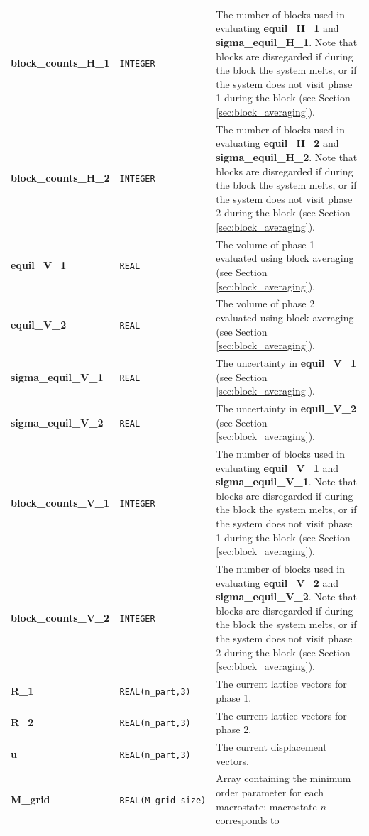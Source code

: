 \documentclass{report}
\begin{document}
\begin{landscape}
\begin{center}
\begin{longtable}{ l l p{8cm}}
\textbf{block\_counts\_H\_1} & \texttt{INTEGER} & The number of blocks used in evaluating \textbf{equil\_H\_1} and \textbf{sigma\_equil\_H\_1}. Note that blocks are
disregarded if during the block the system melts, or if the system does not visit phase 1 during the block  (see Section \ref{sec:block_averaging}). \\
\textbf{block\_counts\_H\_2} & \texttt{INTEGER} &  The number of blocks used in evaluating \textbf{equil\_H\_2} and \textbf{sigma\_equil\_H\_2}. Note that blocks are
disregarded if during the block the system melts, or if the system does not visit phase 2 during the block  (see Section \ref{sec:block_averaging}). \\
\textbf{equil\_V\_1} & \texttt{REAL} & The volume of phase 1 evaluated using block averaging (see Section \ref{sec:block_averaging}).\\
\textbf{equil\_V\_2} & \texttt{REAL} & The volume of phase 2 evaluated using block averaging (see Section \ref{sec:block_averaging}).\\
\textbf{sigma\_equil\_V\_1} & \texttt{REAL} &  The uncertainty in \textbf{equil\_V\_1} (see Section \ref{sec:block_averaging}).\\
\textbf{sigma\_equil\_V\_2} & \texttt{REAL} &  The uncertainty in \textbf{equil\_V\_2} (see Section \ref{sec:block_averaging}).\\
\textbf{block\_counts\_V\_1} & \texttt{INTEGER} & The number of blocks used in evaluating \textbf{equil\_V\_1} and \textbf{sigma\_equil\_V\_1}. Note that blocks are
disregarded if during the block the system melts, or if the system does not visit phase 1 during the block  (see Section \ref{sec:block_averaging}). \\
\textbf{block\_counts\_V\_2} & \texttt{INTEGER} &  The number of blocks used in evaluating \textbf{equil\_V\_2} and \textbf{sigma\_equil\_V\_2}. Note that blocks are
disregarded if during the block the system melts, or if the system does not visit phase 2 during the block (see Section \ref{sec:block_averaging}). \\
\textbf{R\_1} & \texttt{REAL(n\_part,3)} & The current lattice vectors for phase 1. \\
\textbf{R\_2} & \texttt{REAL(n\_part,3)} & The current lattice vectors for phase 2.\\
\textbf{u} & \texttt{REAL(n\_part,3)} & The current displacement vectors.\\
\textbf{M\_grid} & \texttt{REAL(M\_grid\_size)} & Array containing the minimum order parameter for each macrostate: macrostate $n$ corresponds to 

\end{longtable}
\end{center}
\end{landscape}
\end{document}

